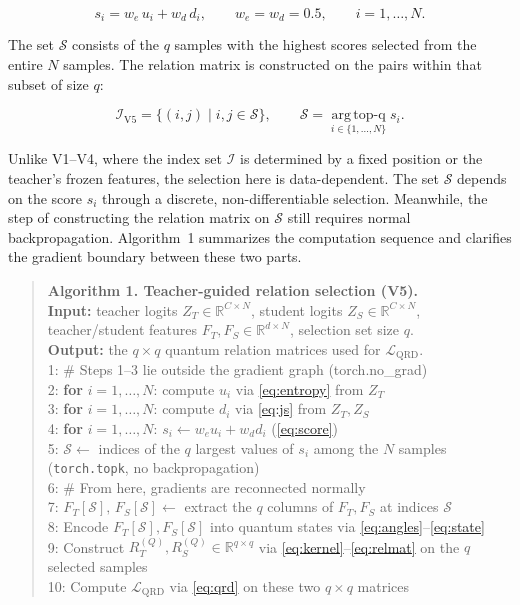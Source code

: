 \begin{equation}
\label{eq:score}
s_i = w_e\,u_i + w_d\,d_i, \qquad w_e = w_d = 0.5,
\qquad i = 1,\ldots,N.
\end{equation}

The set $\mathcal{S}$ consists of the $q$ samples with the highest
scores selected from the entire $N$ samples. The relation matrix is
constructed on the pairs within that subset of size $q$:

\begin{equation}
\label{eq:i-v5}
\mathcal{I}_{\mathrm{V5}} = \{(i,j) \mid i,j \in \mathcal{S}\},
\qquad \mathcal{S} = \operatorname*{arg\,top\text{-}q}_{i \in \{1,\ldots,N\}} s_i.
\end{equation}

Unlike V1--V4, where the index set $\mathcal{I}$ is determined by a
fixed position or the teacher's frozen features, the selection here is data-dependent. The set $\mathcal{S}$ depends on the score $s_i$ through a discrete, non-differentiable selection. Meanwhile, the step of
constructing the relation matrix on $\mathcal{S}$ still requires
normal backpropagation. Algorithm~1 summarizes the computation
sequence and clarifies the gradient boundary between these two
parts.

\begin{quote}
\ttfamily\small\raggedright
\noindent\textbf{Algorithm 1. Teacher-guided relation selection (V5).}\\[2pt]
\textbf{Input:} teacher logits $Z_T \in \mathbb{R}^{C \times N}$,
student logits $Z_S \in \mathbb{R}^{C \times N}$, teacher/student
features $F_T, F_S \in \mathbb{R}^{d \times N}$, selection set size
$q$.\\
\textbf{Output:} the $q \times q$ quantum relation matrices used for
$\mathcal{L}_{\mathrm{QRD}}$.\\[4pt]
1: \quad \# Steps 1--3 lie outside the gradient graph (torch.no\_grad)\\
2: \quad \textbf{for} $i = 1,\ldots,N$: compute $u_i$ via
\eqref{eq:entropy} from $Z_T$\\
3: \quad \textbf{for} $i = 1,\ldots,N$: compute $d_i$ via
\eqref{eq:js} from $Z_T, Z_S$\\
4: \quad \textbf{for} $i = 1,\ldots,N$: $s_i \leftarrow w_e u_i + w_d d_i$
(\eqref{eq:score})\\
5: \quad $\mathcal{S} \leftarrow$ indices of the $q$ largest values
of $s_i$ among the $N$ samples (\texttt{torch.topk}, no
backpropagation)\\[4pt]
6: \quad \# From here, gradients are reconnected normally\\
7: \quad $F_T[\mathcal{S}],\, F_S[\mathcal{S}] \leftarrow$ extract
the $q$ columns of $F_T, F_S$ at indices $\mathcal{S}$\\
8: \quad Encode $F_T[\mathcal{S}], F_S[\mathcal{S}]$ into quantum
states via \eqref{eq:angles}--\eqref{eq:state}\\
9: \quad Construct $R_T^{(Q)}, R_S^{(Q)} \in \mathbb{R}^{q \times q}$
via \eqref{eq:kernel}--\eqref{eq:relmat} on the $q$ selected samples\\
10: \quad Compute $\mathcal{L}_{\mathrm{QRD}}$ via \eqref{eq:qrd} on
these two $q \times q$ matrices
\end{quote}

